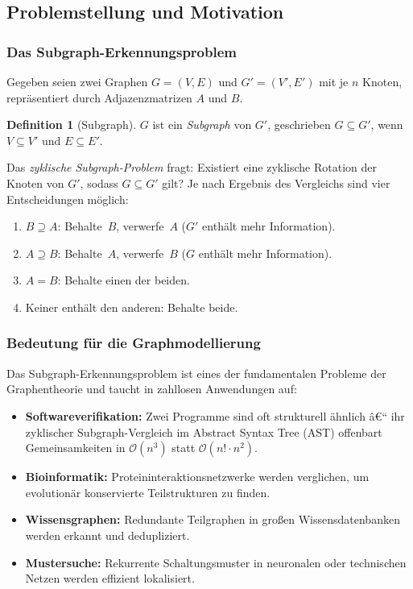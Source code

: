﻿\documentclass[12pt,a4paper,twoside]{article}
\theoremstyle{definition}
\newtheorem{definition}{Definition}[section]
\theoremstyle{plain}
\theoremstyle{remark}
\begin{document}
\subsection{Problemstellung und Motivation}
\label{sub:sa_motivation}

\subsubsection{Das Subgraph-Erkennungsproblem}

Gegeben seien zwei Graphen $G = (V, E)$ und
$G' = (V', E')$ mit je $n$ Knoten, repräsentiert durch
Adjazenzmatrizen $A$ und $B$.

\begin{definition}[Subgraph]
$G$ ist ein \emph{Subgraph} von $G'$, geschrieben
$G \subseteq G'$, wenn $V \subseteq V'$ und $E \subseteq E'$.
\end{definition}

\noindent
Das \emph{zyklische Subgraph-Problem} fragt:
Existiert eine zyklische Rotation der Knoten von $G'$,
sodass $G \subseteq G'$ gilt?  Je nach Ergebnis des
Vergleichs sind vier Entscheidungen möglich:
\begin{enumerate}
  \item $B \supseteq A$: Behalte~$B$, verwerfe~$A$
        ($G'$ enthält mehr Information).
  \item $A \supseteq B$: Behalte~$A$, verwerfe~$B$
        ($G$ enthält mehr Information).
  \item $A = B$: Behalte einen der beiden.
  \item Keiner enthält den anderen: Behalte beide.
\end{enumerate}

\subsubsection{Bedeutung für die Graphmodellierung}

Das Subgraph-Erkennungsproblem ist eines der fundamentalen
Probleme der Graphentheorie und taucht in zahllosen
Anwendungen auf:
\begin{itemize}
  \item \textbf{Softwareverifikation:} Zwei Programme sind
        oft strukturell ähnlich â€“ ihr zyklischer Subgraph-Vergleich
        im Abstract Syntax Tree (AST) offenbart Gemeinsamkeiten in
        $\mathcal{O}(n^3)$ statt $\mathcal{O}(n! \cdot n^2)$.
  \item \textbf{Bioinformatik:} Proteininteraktionsnetzwerke
        werden verglichen, um evolutionär konservierte Teilstrukturen
        zu finden.
  \item \textbf{Wissensgraphen:} Redundante Teilgraphen in großen
        Wissensdatenbanken werden erkannt und dedupliziert.
  \item \textbf{Mustersuche:} Rekurrente Schaltungsmuster in
        neuronalen oder technischen Netzen werden effizient lokalisiert.
\end{itemize}
\end{document}
